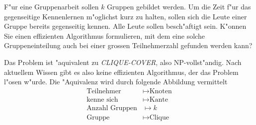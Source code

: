 F"ur eine Gruppenarbeit sollen $k$ Gruppen gebildet werden.
Um die Zeit f"ur das gegenseitige Kennenlernen m"oglichst
kurz zu halten, sollen sich die Leute einer Gruppe bereits
gegenseitig kennen. Alle Leute sollen besch"aftigt sein.
K"onnen Sie einen effizienten Algorithmus
formulieren, mit dem eine solche Gruppeneinteilung auch bei
einer grossen Teilnehmerzahl gefunden werden kann?

\begin{loesung}
Das Problem ist "aquivalent zu \textsl{CLIQUE-COVER}, also
NP-vollst"andig. Nach aktuellem Wissen gibt es also keine
effizienten Algorithmus, der das Problem l"osen w"urde. Die
"Aquivalenz wird durch folgende Abbildung vermittelt
\begin{align*}
\text{Teilnehmer}&\mapsto\text{Knoten}\\
\text{kenne sich}&\mapsto\text{Kante}\\
\text{Anzahl Gruppen}&\mapsto k\\
\text{Gruppe}&\mapsto\text{Clique}
\end{align*}
\end{loesung}
